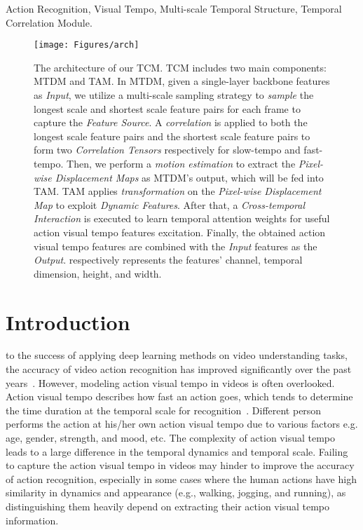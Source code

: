 \documentclass[journal]{IEEEtran}
\begin{document}
\begin{IEEEkeywords}
Action Recognition, Visual Tempo, Multi-scale Temporal Structure, Temporal Correlation Module.
\end{IEEEkeywords}

\IEEEpeerreviewmaketitle

\begin{figure*}[tbp]
  \texttt{[image: Figures/arch]}
  \caption{The architecture of our TCM. TCM includes two main components: MTDM and TAM. In MTDM, given a single-layer backbone features as \textit{Input}, we utilize a multi-scale sampling strategy to \textit{sample} the longest scale and shortest scale feature pairs for each frame to capture the \textit{Feature Source}. A \textit{correlation} is applied to both the longest scale feature pairs and the shortest scale feature pairs to form two \textit{Correlation Tensors} respectively for slow-tempo and fast-tempo. Then, we perform a \textit{motion estimation} to extract the \textit{Pixel-wise Displacement Maps} as MTDM's output, which will be fed into TAM. TAM applies \textit{transformation} on the \textit{Pixel-wise Displacement Map} to exploit \textit{Dynamic Features}. After that, a \textit{Cross-temporal Interaction} is executed to learn temporal attention weights for useful action visual tempo features excitation. Finally, the obtained action visual tempo features are combined with the \textit{Input} features as the \textit{Output}.  respectively represents the features' channel, temporal dimension, height, and width.}
  \label{fig:arch}
\end{figure*}


\section{Introduction}
 to the success of applying deep learning methods on video understanding tasks, the accuracy of video action recognition has improved significantly over the past years~\cite{simonyan2014two,t2016du,girdhar2019video,feichtenhofer2020x3d,arnab2021vivit}. However, modeling action visual tempo in videos is often overlooked. Action visual tempo describes how fast an action goes, which tends to determine the time duration at the temporal scale for recognition~\cite{yang2020temporal}. Different person performs the action at his/her own action visual tempo due to various factors e.g. age, gender, strength, and mood, etc. The complexity of action visual tempo leads to a large difference in the temporal dynamics and temporal scale. Failing to capture the action visual tempo in videos may hinder to improve the accuracy of action recognition, especially in some cases where the human actions have high similarity in dynamics and appearance (e.g., walking, jogging, and running), as distinguishing them heavily depend on extracting their action visual tempo information.
\end{document}
